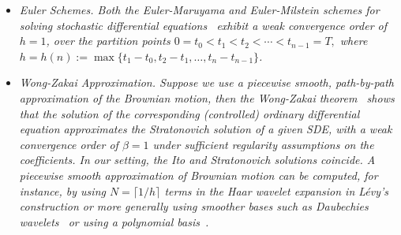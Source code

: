 \documentclass[11pt,leqno]{amsart}
\begin{document}
\begin{itemize}
    \item 
    \it{Euler Schemes.} Both the Euler-Maruyama and Euler-Milstein schemes for solving stochastic differential equations~\cite[Ch. X]{Asmussen_2007} exhibit a weak convergence order of $h=1$, over the partition points $0 = t_0 < t_1 < t_2 < \cdots < t_{n-1} = T,$ where $h = h(n):= \max\{t_1 - t_0, t_2-t_1, \ldots, t_n - t_{n-1}\}$.

    \item
    \it{Wong-Zakai Approximation.} Suppose we use a piecewise smooth, path-by-path approximation of the Brownian motion, then the Wong-Zakai theorem~\citep{Twardowska1996} shows that the solution of the corresponding (controlled) ordinary differential equation approximates the Stratonovich solution of a given SDE, with a weak convergence order of $\beta=1$ under sufficient regularity assumptions on the coefficients. In our setting, the Ito and Stratonovich solutions coincide. A piecewise smooth approximation of Brownian motion can be computed, for instance, by using $N = \lceil 1/h\rceil$ terms in the Haar wavelet expansion in L\'evy's construction or more generally using smoother bases such as Daubechies wavelets~\citep{Grebenkov2016} or using a polynomial basis~\citep{foster2020optimal}.
\end{itemize}
\end{document}
